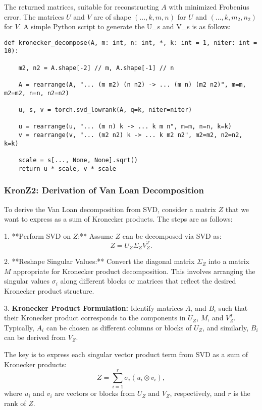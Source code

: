 \documentclass{article}
\begin{document}
{The returned matrices, suitable for reconstructing \( A \) with minimized Frobenius error. The matrices \( U \) and \( V \) are of shape \( (..., k, m, n) \) for \( U \) and \( (..., k, m_2, n_2) \) for \( V \). A simple Python script to generate the U_s and V_s is as follows:


\begin{verbatim}
def kronecker_decompose(A, m: int, n: int, *, k: int = 1, niter: int = 10):

    m2, n2 = A.shape[-2] // m, A.shape[-1] // n
	
    A = rearrange(A, "... (m m2) (n n2) -> ... (m n) (m2 n2)", m=m, m2=m2, n=n, n2=n2)

    u, s, v = torch.svd_lowrank(A, q=k, niter=niter)

    u = rearrange(u, "... (m n) k -> ... k m n", m=m, n=n, k=k)
    v = rearrange(v, "... (m2 n2) k -> ... k m2 n2", m2=m2, n2=n2, k=k)

    scale = s[..., None, None].sqrt()
    return u * scale, v * scale
\end{verbatim}

\subsubsection{KronZ2: Derivation of Van Loan Decomposition}

To derive the Van Loan decomposition from SVD, consider a matrix \( Z \) that we want to express as a sum of Kronecker products. The steps are as follows:

1. **Perform SVD on \( Z \):**
   Assume \( Z \) can be decomposed via SVD as:
   \[
   Z = U_Z \Sigma_Z V_Z^T.
   \]

2. **Reshape Singular Values:**
   Convert the diagonal matrix \( \Sigma_Z \) into a matrix \( M \) appropriate for Kronecker product decomposition. This involves arranging the singular values \( \sigma_i \) along different blocks or matrices that reflect the desired Kronecker product structure.

   3. \textbf{Kronecker Product Formulation:}
   Identify matrices \( A_i \) and \( B_i \) such that their Kronecker product corresponds to the components in \( U_Z \), \( M \), and \( V_Z^T \). Typically, \( A_i \) can be chosen as different columns or blocks of \( U_Z \), and similarly, \( B_i \) can be derived from \( V_Z \).

   The key is to express each singular vector product term from SVD as a sum of Kronecker products:
   \[
   Z = \sum_{i=1}^r \sigma_i (u_i \otimes v_i),
   \]
   where \( u_i \) and \( v_i \) are vectors or blocks from \( U_Z \) and \( V_Z \), respectively, and \( r \) is the rank of \( Z \).





}
\end{document}
